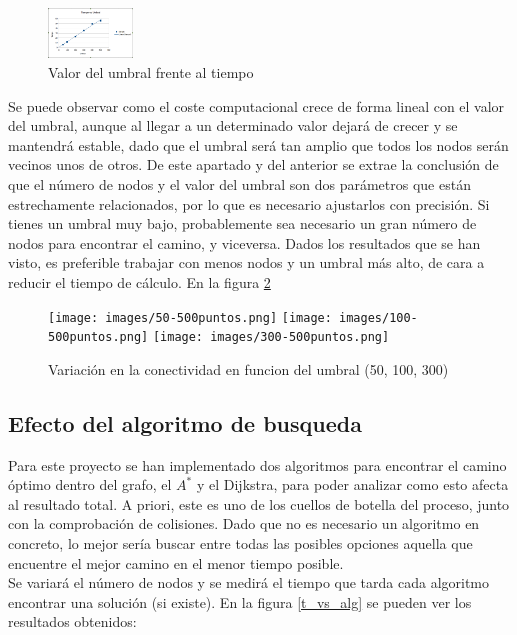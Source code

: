 \begin{figure}[H]
		\centering
        \includegraphics[width=0.2\textwidth]{images/t_vs_umbral.png}
        \caption{Valor del umbral frente al tiempo}
        \label{fig:umbral_vs_t}
\end{figure}

Se puede observar como el coste computacional crece de forma lineal con el valor del umbral, aunque al llegar a un determinado valor dejará de crecer y se mantendrá estable, dado que el umbral será tan amplio que todos los nodos serán vecinos unos de otros. De este apartado y del anterior se extrae la conclusión de que el número de nodos y el valor del umbral son dos parámetros que están estrechamente relacionados, por lo que es necesario ajustarlos con precisión. Si tienes un umbral muy bajo, probablemente sea necesario un gran número de nodos para encontrar el camino, y viceversa. Dados los resultados que se han visto, es preferible trabajar con menos nodos y un umbral más alto, de cara a reducir el tiempo de cálculo. En la figura \ref{fig:50_100_300umbral}

\begin{figure}[h]
		\centering
        \texttt{[image: images/50-500puntos.png]}
        \texttt{[image: images/100-500puntos.png]}
        \texttt{[image: images/300-500puntos.png]}
        \caption{Variación en la conectividad en funcion del umbral (50, 100, 300)}
        \label{fig:50_100_300umbral}
\end{figure}

\subsection{Efecto del algoritmo de busqueda}

Para este proyecto se han implementado dos algoritmos para encontrar el camino óptimo dentro del grafo, el $A^*$ y el Dijkstra, para poder analizar como esto afecta al resultado total. A priori, este es uno de los cuellos de botella del proceso, junto con la comprobación de colisiones. Dado que no es necesario un algoritmo en concreto, lo mejor sería buscar entre todas las posibles opciones aquella que encuentre el mejor camino en el menor tiempo posible.\\

Se variará el número de nodos y se medirá el tiempo que tarda cada algoritmo encontrar una solución (si existe). En la figura \ref{t_vs_alg} se pueden ver los resultados obtenidos:\\

